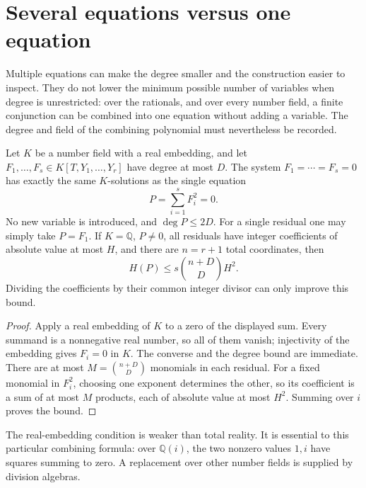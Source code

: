 \section{Several equations versus one equation}
\label{p3sys:combination}

Multiple equations can make the degree smaller and the construction
easier to inspect.  They do not lower the minimum possible number of
variables when degree is unrestricted: over the rationals, and over
every number field, a finite conjunction can be combined into one
equation without adding a variable.  The degree and field of the
combining polynomial must nevertheless be recorded.

\begin{proposition}\label{p3sys:sos-combination}
Let $K$ be a number field with a real embedding, and let
$F_1,\ldots,F_s\in K[T,Y_1,\ldots,Y_r]$ have degree at most $D$.
The system $F_1=\cdots=F_s=0$ has exactly the same $K$-solutions
as the single equation
\[
                         P=\sum_{i=1}^sF_i^2=0.
\]
No new variable is introduced, and $\deg P\le2D$.
For a single residual one may simply take $P=F_1$.
If $K=\mathbb Q$, $P\ne0$, all residuals have integer coefficients of
absolute value at most $H$, and there are $n=r+1$ total
coordinates, then
\[
               H(P)\le s\binom{n+D}{D}H^2.
\]
Dividing the coefficients by their common integer divisor can
only improve this bound.
\end{proposition}
\begin{proof}
Apply a real embedding of $K$ to a zero of the displayed sum.
Every summand is a nonnegative real number, so all of them vanish;
injectivity of the embedding gives $F_i=0$ in $K$.  The converse
and the degree bound are immediate.  There are at most
$M=\binom{n+D}{D}$ monomials in each residual.  For a fixed
monomial in $F_i^2$, choosing one exponent determines the other,
so its coefficient is a sum of at most $M$ products, each of
absolute value at most $H^2$.  Summing over $i$ proves the bound.
\end{proof}

The real-embedding condition is weaker than total reality.
It is essential to this particular combining formula: over
$\mathbb Q(i)$, the two nonzero values $1,i$ have squares summing
to zero.  A replacement over other number fields is supplied by
division algebras.

